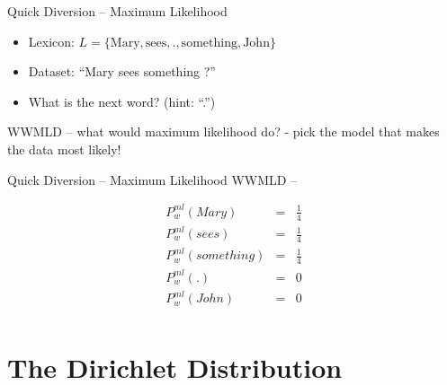 \documentclass[11pt]{beamer}
\begin{document}
	\begin{frame}{Quick Diversion -- Maximum Likelihood}
		\begin{itemize}
			\item Lexicon: $L = \lbrace \text{Mary}, \text{sees}, \text{.}, \text{something}, \text{John}  \rbrace$
			\item Dataset: ``Mary sees something ?''
			\item What is the next word? (hint: ``.'')
		\end{itemize}
		
		WWMLD -- what would maximum likelihood do? - pick the model that makes the data most likely!
	\end{frame}
	
	\begin{frame}{Quick Diversion -- Maximum Likelihood}
		WWMLD --
		
		\begin{align*}
			P^{ml}_{w}(Mary) & = & \frac{1}{4}\\
			P^{ml}_{w}(sees) & = & \frac{1}{4}\\
			P^{ml}_{w}(something) & = & \frac{1}{4}\\
			P^{ml}_{w}(.) & = & 0 \\
			P^{ml}_{w}(John) & = & 0\\
		\end{align*}		
	\end{frame}
	
	\section{The Dirichlet Distribution}
	
\end{document}
